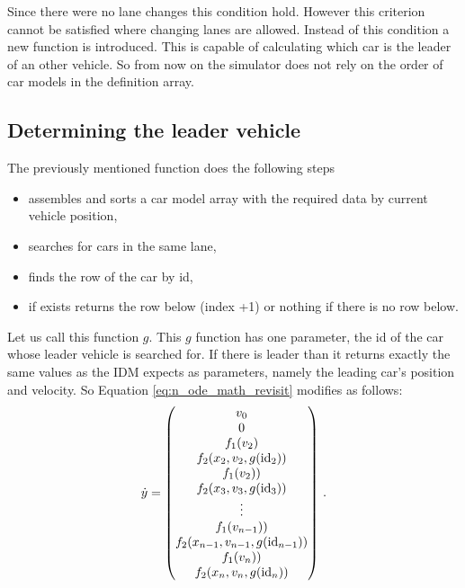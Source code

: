 		Since there were no lane changes this condition hold. However this criterion cannot be satisfied where changing lanes are allowed. Instead of this condition a new function is introduced. This is capable of calculating which car is the leader of an other vehicle. So from now on the simulator does not rely on the order of car models in the definition array.
		\subsection*{Determining the leader vehicle}
		The previously mentioned function does the following steps
		\begin{itemize}
			\item assembles and sorts a car model array with the required data by current vehicle position,
			\item searches for cars in the same lane,
			\item finds the row of the car by id,
			\item if exists returns the row below (index +1) or nothing if there is no row below.
		\end{itemize}
		Let us call this function $g$. This $g$ function has one parameter, the id of the car whose leader vehicle is searched for. If there is leader than it returns exactly the same values as the IDM expects as parameters, namely the leading car's position and velocity.
		So Equation \ref{eq:n_ode_math_revisit} modifies as follows:
		\begin{equation}
			\dot{y}=
			\begin{pmatrix}
			v_0\\
			0\\
			f_1(v_2)\\
			f_2(x_{2}, v_{2},g({\rm id}_2))\\
			f_1(v_2))\\
			f_2(x_{3}, v_{3},g({\rm id}_3))\\
			\vdots\\
			f_1(v_{n-1}))\\
			f_2(x_{n-1}, v_{n-1},g({\rm id}_{n-1}))\\
			f_1(v_n))\\
			f_2(x_{n}, v_{n},g({\rm id}_{n}))
			\end{pmatrix}\,.
			\label{eq:n_ode_math_with_find_leading}
		\end{equation}
